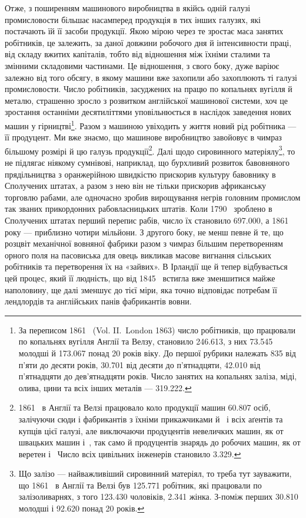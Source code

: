 Отже, з поширенням машинового виробництва в якійсь одній
галузі промисловости більшає насамперед продукція в тих інших
галузях, які постачають їй її засоби продукції. Якою мірою
через те зростає маса занятих робітників, це залежить, за
даної довжини робочого дня й інтенсивности праці, від складу
вжитих капіталів, тобто від відношення між їхніми сталими та
змінними складовими частинами. Це відношення, з свого боку,
дуже варіює залежно від того обсягу, в якому машини вже захопили
або захоплюють ті галузі промисловости. Число робітників,
засуджених на працю по копальнях вугілля й металю, страшенно
зросло з розвитком англійської машинової системи, хоч це зростання
останніми десятиліттями уповільнюється в наслідок заведення
нових машин у гірництві\footnote{
За переписом 1861~ (Vol. II.~London 1863) число робітників,
що працювали по копальнях вугілля Англії та Велзу, становило \num{246.613},
з них \num{73.545} молодші й \num{173.067} понад 20 років віку. До першої рубрики
належать 835 від п’яти до десяти років, \num{30.701} від десяти до п’ятнадцяти,
\num{42.010} від п’ятнадцяти до дев’ятнадцяти років. Число занятих
на копальнях заліза, міді, олива, цини та всіх інших металів — \num{319.222}.
}. Разом з машиною увіходить
у життя новий рід робітника — її продуцент. Ми вже знаємо, що
машинове виробництво завойовує в чимраз більшому розмірі й
цю галузь продукції\footnote{
1861~ в Англії та Велзі працювало коло продукції машин \num{60.807}
осіб, залічуючи сюди і фабрикантів з їхніми прикажчиками й~ і всіх
аґентів та купців цієї галузі, але виключаючи продуцентів невеличких
машин, як от швацьких машин і~, так само й продуцентів знарядь
до робочих машин, як от веретен і~ Число всіх цивільних інженерів
становило \num{3.329}.
}. Далі щодо сировинного матеріялу\footnote{
Що залізо — найважливіший сировинний матеріял, то треба тут
зауважити, що 1861~ в Англії та Велзі був \num{125.771} робітник, які
працювали по залізоливарнях, з того \num{123.430} чоловіків, \num{2.341} жінка.
З-поміж перших \num{30.810} молодші і \num{92.620} понад 20 років.
}, то не підлягає ніякому сумнівові, наприклад, що бурхливий розвиток
бавовняного прядільництва з оранжерійною швидкістю прискорив
культуру бавовнику в Сполучених штатах, а разом з нею
він не тільки прискорив африканську торговлю рабами, але
одночасно зробив вирощування негрів головним промислом так
званих прикордонних рабовласницьких штатів. Коли 1790~
зроблено в Сполучених штатах перший перепис рабів, число їх
становило \num{697.000}, а 1861 року — приблизно чотири мільйони.
З другого боку, не менш певне й те, що розцвіт механічної вовняної
фабрики разом з чимраз більшим перетворенням орного поля на
пасовиська для овець викликав масове вигнання сільських робітників
та перетворення їх на «зайвих». В Ірландії ще й тепер
відбувається цей процес, який її людність, що від 1845~ встигла
вже зменшитися майже наполовину, ще далі зменшує до тієї
міри, яка точно відповідає потребам її лендлордів та англійських
панів фабрикантів вовни.

